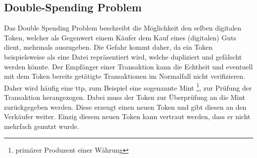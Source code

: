 \subsection{Double-Spending Problem}
\label{sec:sota_doublespend}
	Das Double Spending Problem beschreibt die Möglichkeit den selben digitalen Token, welcher als Gegenwert einem Käufer dem Kauf eines (digitalen) Guts dient, mehrmals auszugeben\cite{Chohan2017}.
	Die Gefahr kommt daher, da ein Token beispielsweise als eine Datei repräsentiert wird, welche dupliziert und gefälscht werden könnte\cite{Chohan2017}.
	Der Empfänger einer Transaktion kann die Echtheit und eventuell mit dem Token bereits getätigte Transaktionen im Normalfall nicht verifizieren\cite{Nakamoto2008}.
	Daher wird häufig eine \gls{ttp}, zum Beispiel eine sogenannte Mint \!\footnote{primärer Produzent einer Währung}, zur Prüfung der Transaktion herangezogen\cite{Nakamoto2008}.
	Dabei muss der Token zur Überprüfung an die Mint zurückgegeben werden. 
	Diese erzeugt einen neuen Token und gibt diesen an den Verkäufer weiter.
	Einzig diesem neuen Token kann vertraut werden, dass er nicht mehrfach genutzt wurde\cite{Nakamoto2008}.